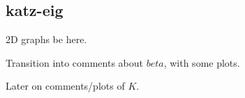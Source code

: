
\subsection{katz-eig}

2D graphs be here.

Transition into comments about $beta$, with some plots.

Later on comments/plots of $K$.

